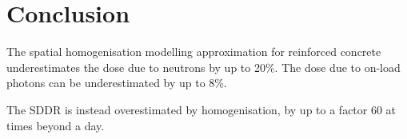 \section{Conclusion}
The spatial homogenisation modelling approximation for reinforced concrete underestimates the dose due to neutrons by up to 20\%. The dose due to on-load photons can be underestimated by up to 8\%.\par
The SDDR is instead overestimated by homogenisation, by up to a factor 60 at times beyond a day. 
